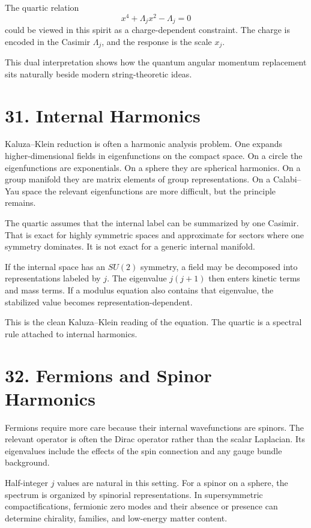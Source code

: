 \documentclass[11pt]{article}
\newcommand{\Lspin}{\Lambda_j}
\begin{document}
The quartic relation
\[
        x^4+\Lspin x^2-\Lspin=0
\]
could be viewed in this spirit as a charge-dependent constraint. The charge is encoded in the Casimir \(\Lspin\), and the response is the scale \(x_j\).

This dual interpretation shows how the quantum angular momentum replacement sits naturally beside modern string-theoretic ideas.


\section*{31. Internal Harmonics}

Kaluza--Klein reduction is often a harmonic analysis problem. One expands higher-dimensional fields in eigenfunctions on the compact space. On a circle the eigenfunctions are exponentials. On a sphere they are spherical harmonics. On a group manifold they are matrix elements of group representations. On a Calabi--Yau space the relevant eigenfunctions are more difficult, but the principle remains.

The quartic assumes that the internal label can be summarized by one Casimir. That is exact for highly symmetric spaces and approximate for sectors where one symmetry dominates. It is not exact for a generic internal manifold.

If the internal space has an \(SU(2)\) symmetry, a field may be decomposed into representations labeled by \(j\). The eigenvalue \(j(j+1)\) then enters kinetic terms and mass terms. If a modulus equation also contains that eigenvalue, the stabilized value becomes representation-dependent.

This is the clean Kaluza--Klein reading of the equation. The quartic is a spectral rule attached to internal harmonics.


\section*{32. Fermions and Spinor Harmonics}

Fermions require more care because their internal wavefunctions are spinors. The relevant operator is often the Dirac operator rather than the scalar Laplacian. Its eigenvalues include the effects of the spin connection and any gauge bundle background.

Half-integer \(j\) values are natural in this setting. For a spinor on a sphere, the spectrum is organized by spinorial representations. In supersymmetric compactifications, fermionic zero modes and their absence or presence can determine chirality, families, and low-energy matter content.
\end{document}
